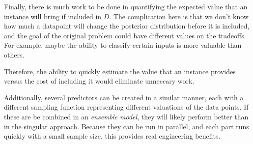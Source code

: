 \documentclass[twoside]{article}
\begin{document}
Finally, there is much work to be done in quantifying the expected value that an instance will bring if included in \(D\). The complication here is that we don't know how much a datapoint will change the posterior distribution before it is included, and the goal of the original problem could have different values on the tradeoffs. For example, maybe the ability to classify certain inputs is more valuable than others.

Therefore, the ability to quickly estimate the value that an instance provides versus the cost of including it would eliminate unneccary work.

Additionally, several predictors can be created in a similar manner, each with a different sampling function representing different valuations of the data points. If these are be combined in an \textit{ensemble model}, they will likely perform better than in the singular approach. Because they can be run in parallel, and each part runs quickly with a small sample size, this provides real engineering benefits.
\end{document}
